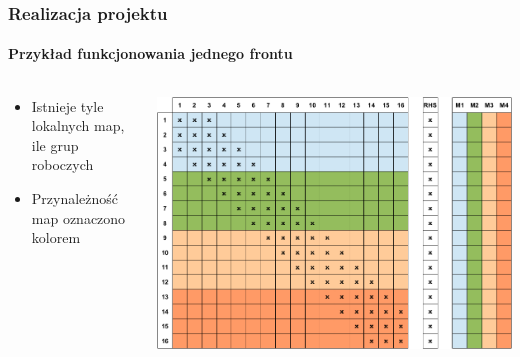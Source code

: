 \documentclass{beamer}
\begin{document}
\begin{frame}
\frametitle{Realizacja projektu}
\framesubtitle{Przykład funkcjonowania jednego frontu}
\begin{columns}[t] %
     \begin{column}[T]{5cm} %
     \begin{itemize}
		\item Istnieje tyle lokalnych map, ile grup roboczych
		\item Przynależność map oznaczono kolorem
     \end{itemize}
     \end{column}
     \begin{column}[T]{7cm} %
		\includegraphics[scale=0.3]{frame0.jpg}
     \end{column}
     \end{columns}
\end{frame}
\end{document}
